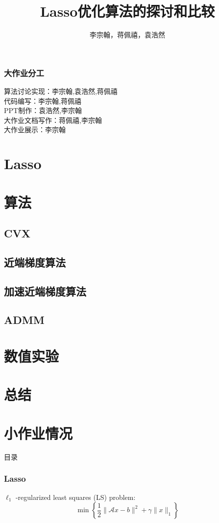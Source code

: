 \documentclass[10pt,aspectratio=43,mathserif,dvipsnames,svgnames,x11names]{beamer}
\begin{document}
	\title{Lasso优化算法的探讨和比较}
	\author{李宗翰，蒋佩禧，袁浩然}
	
	\begin{frame}[plain]
		\titlepage
	\end{frame}


	\begin{frame}
		\frametitle{大作业分工}
		算法讨论实现：李宗翰,袁浩然,蒋佩禧\\
		代码编写：李宗翰,蒋佩禧\\
		PPT制作：袁浩然,李宗翰\\
		大作业文档写作：蒋佩禧,李宗翰\\
		大作业展示：李宗翰		
	\end{frame}
\section{Lasso}
\section{算法}
\subsection{CVX}
\subsection{近端梯度算法}
\subsection{加速近端梯度算法}
\subsection{ADMM}
\section{数值实验}
\section{总结}
\section{小作业情况}
\begin{frame}{目录}
	\tableofcontents
\end{frame}
	\begin{frame}
		\frametitle{Lasso}
		$\ell_{1}$ -regularized least squares (LS) problem:
		$$\min \left\{\frac{1}{2}\|\mathcal{A} x-b\|^{2}+\gamma\|x\|_{1}\right\}$$
	\end{frame}
\end{document}
